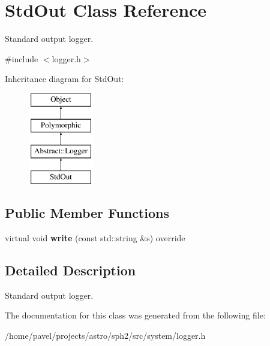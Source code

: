 \hypertarget{classStdOut}{}\section{Std\+Out Class Reference}
\label{classStdOut}


Standard output logger.  




{\ttfamily \#include $<$logger.\+h$>$}

Inheritance diagram for Std\+Out\+:\begin{figure}[H]
\begin{center}
\leavevmode
\includegraphics[height=4.000000cm]{classStdOut}
\end{center}
\end{figure}
\subsection*{Public Member Functions}
\begin{DoxyCompactItemize}
\item 
\hypertarget{classStdOut_a4f968fcf9158797749c4d8aad2da7ceb}{}\label{classStdOut_a4f968fcf9158797749c4d8aad2da7ceb} 
virtual void {\bfseries write} (const std\+::string \&s) override
\end{DoxyCompactItemize}


\subsection{Detailed Description}
Standard output logger. 

The documentation for this class was generated from the following file\+:\begin{DoxyCompactItemize}
\item 
/home/pavel/projects/astro/sph2/src/system/logger.\+h\end{DoxyCompactItemize}
